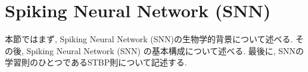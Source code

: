 \section{Spiking Neural Network (SNN)}
本節ではまず, Spiking Neural Network (SNN)の生物学的背景について述べる.
その後, Spiking Neural Network (SNN) の基本構成について述べる.
最後に, SNNの学習則のひとつであるSTBP則について記述する.




